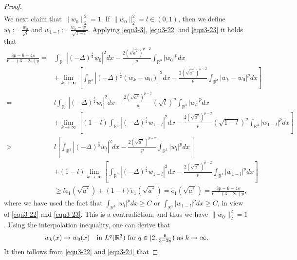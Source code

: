 \documentclass[reqno, 11pt]{amsart} %
\numberwithin{equation}{section}
\begin{document}
\begin{proof}
\begin{equation}
\begin{split}
			\end{split}
		\end{equation}
		We next claim that $\|w_{0}\|_{2}^{2}=1$. If $\|w_{0}\|_{2}^{2}=l\in (0, 1)$, then we define $w_{l}:=\frac{w_{0}}{\sqrt{l}}$ and $w_{1-l}:=\frac{w_{k}-w_{0}}{\sqrt{1-l}}$. Applying \eqref{equ3-3}, \eqref{equ3-22} and \eqref{equ3-23} it holds that
		\begin{equation*}
			\begin{split}
				\frac{3p-6-4s}{6-(3-2s)p}=&\int_{\mathbb{R}^{3}}|(-\Delta)^{\frac{s}{2}} w_{0}|^{2}dx-\frac{2(\sqrt{a^{\ast}})^{p-2}}{p}\int_{\mathbb{R}^{3}}|w_{0}|^{p}dx \\
				&+\lim_{k\rightarrow\infty}\left[\int_{\mathbb{R}^{3}}|(-\Delta)^{\frac{s}{2}} (w_{k}-w_{0})|^{2}dx- \frac{2(\sqrt{a^{\ast}})^{p-2}}{p}\int_{\mathbb{R}^{3}}|w_{k}-w_{0}|^{p}dx\right] \\
				=&l\int_{\mathbb{R}^{3}}|(-\Delta)^{\frac{s}{2}} w_{l}|^{2}dx-\frac{2(\sqrt{a^{\ast}})^{p-2}}{p}(\sqrt{l})^{p}\int_{\mathbb{R}^{3}}|w_{l}|^{p}dx \\
				&+\lim_{k\rightarrow\infty}\left[(1-l)\int_{\mathbb{R}^{3}}|(-\Delta)^{\frac{s}{2}}w_{1-l}|^{2}dx- \frac{2(\sqrt{a^{\ast}})^{p-2}}{p}(\sqrt{1-l})^{p}\int_{\mathbb{R}^{3}}|w_{1-l}|^{p}dx\right] \\
				>&l\left[\int_{\mathbb{R}^{3}}|(-\Delta)^{\frac{s}{2}} w_{l}|^{2}dx-\frac{2(\sqrt{a^{\ast}})^{p-2}}{p}\int_{\mathbb{R}^{3}}|w_{l}|^{p}dx \right] \\
				&+(1-l)\lim_{k\rightarrow\infty}\left[\int_{\mathbb{R}^{3}}|(-\Delta)^{\frac{s}{2}} w_{1-l}|^{2}dx- \frac{2(\sqrt{a^{\ast}})^{p-2}}{p}\int_{\mathbb{R}^{3}}|w_{1-l}|^{p}dx\right] \\
				&\geq l\tilde{e}_{1}(\sqrt{a^{\ast}})+(1-l)\tilde{e}_{1}(\sqrt{a^{\ast}})=\tilde{e}_{1}(\sqrt{a^{\ast}})=\frac{3p-6-4s}{6-(3-2s)p},
			\end{split}
		\end{equation*}
		where we have used the fact that $\int_{\mathbb{R}^{3}}|w_{l}|^{p}dx\geq C$ or $\int_{\mathbb{R}^{3}}|w_{1-l}|^{p}dx\geq C$, in view of \eqref{equ3-22} and \eqref{equ3-23}. This is a contradiction, and thus we have $\|w_{0}\|_{2}^{2}=1$. Using  the interpolation inequality, one can derive that
		\begin{equation}\label{equ3-24}
			w_{k}(x)\rightarrow w_{0}(x)\quad \hbox{in $L^{q}(\mathbb{R}^{3})$ for $q\in[2, \frac{6}{3-2s})$ as $k\rightarrow\infty$}.
		\end{equation}
		It then follows from \eqref{equ3-22} and \eqref{equ3-24} that

\end{proof}
\end{document}
